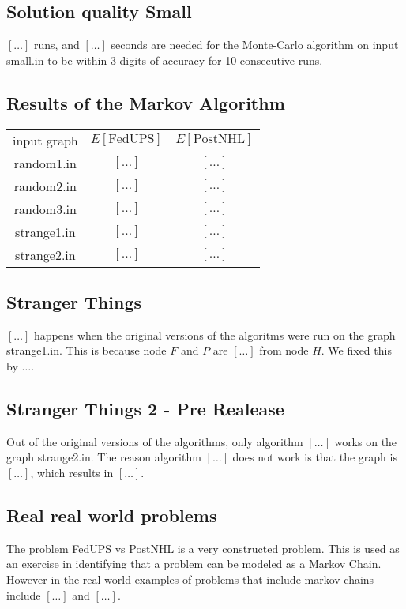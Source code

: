 \documentclass{tufte-handout}
\begin{document}
\subsection{Solution quality Small}

$[\ldots]$ runs, and $[\ldots]$ seconds are needed for the Monte-Carlo algorithm on input small.in to be within $3$ digits of accuracy for 10 consecutive runs.

\subsection{Results of the Markov Algorithm}

\begin{tabular}{c c c}
    input graph & $E[\text{FedUPS}]$ & $E[\text{PostNHL}]$ \\
    random1.in & $[\ldots]$ & $[\ldots]$ \\
    random2.in & $[\ldots]$ & $[\ldots]$ \\
    random3.in & $[\ldots]$ & $[\ldots]$ \\
    strange1.in & $[\ldots]$ & $[\ldots]$ \\
    strange2.in & $[\ldots]$ & $[\ldots]$ \\
\end{tabular}

\subsection{Stranger Things}
$[\ldots]$ happens when the original versions of the algoritms were run on the graph strange1.in. 
This is because node $F$ and $P$ are $[\ldots]$ from node $H$. We fixed this by ${\ldots}$.

\subsection{Stranger Things 2 - Pre Realease}
Out of the original versions of the algorithms, only algorithm $[\ldots]$ works on the graph strange2.in. 
The reason algorithm $[\ldots]$ does not work is that the graph is $[\ldots]$, which results in $[\ldots]$.


\subsection{Real real world problems}
The problem FedUPS vs PostNHL is a very constructed problem. 
This is used as an exercise in identifying that a problem can be modeled as a Markov Chain.
However in the real world examples of problems that include markov chains include $[\ldots]$ and $[\ldots]$.
\end{document}

